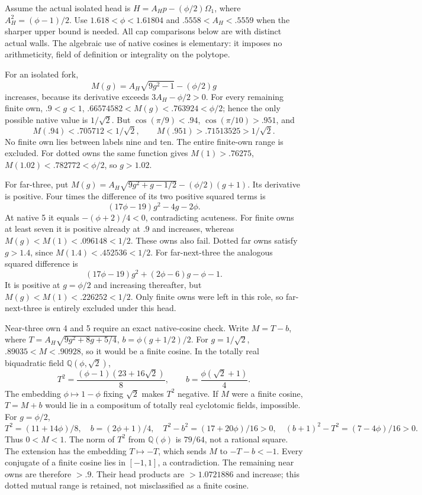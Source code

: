 \documentclass[11pt]{article}
\theoremstyle{definition}
\theoremstyle{remark}
\begin{document}
Assume the actual isolated head is
\(H=A_Hp-(\phi/2)\Omega_1\), where
\(A_H^2=(\phi-1)/2\).
Use \(1.618<\phi<1.61804\) and
\(.5558<A_H<.5559\) when the sharper upper bound is needed.
All cap comparisons below are with distinct actual walls.
The algebraic use of native cosines is elementary: it imposes
no arithmeticity, field of definition or integrality on the polytope.

For an isolated fork,
\[
 M(g)=A_H\sqrt{9g^2-1}-(\phi/2)g
\]
increases, because its derivative exceeds \(3A_H-\phi/2>0\).
For every remaining finite own, \(.9<g<1\),
\(.66574582<M(g)<.763924<\phi/2\); hence the only possible
native value is \(1/\sqrt2\).
But \(\cos(\pi/9)<.94\), \(\cos(\pi/10)>.951\), and
\[
 M(.94)<.705712<1/\sqrt2,\qquad
 M(.951)>.71513525>1/\sqrt2 .
\]
No finite own lies between labels nine and ten.
The entire finite-own range is excluded.
For dotted owns the same function gives
\(M(1)>.76275\), \(M(1.02)<.782772<\phi/2\),
so \(g>1.02\).

For far-three, put
\(M(g)=A_H\sqrt{9g^2+g-1/2}-(\phi/2)(g+1)\).
Its derivative is positive.
Four times the difference of its two positive squared terms is
\[
                  (17\phi-19)g^2-4g-2\phi .
\]
At native 5 it equals \(-(\phi+2)/4<0\), contradicting acuteness.
For finite owns at least seven it is positive already at \(.9\)
and increases, whereas \(M(g)<M(1)<.096148<1/2\).
These owns also fail.
Dotted far owns satisfy \(g>1.4\), since
\(M(1.4)<.452536<1/2\).
For far-next-three the analogous squared difference is
\[
             (17\phi-19)g^2+(2\phi-6)g-\phi-1.
\]
It is positive at \(g=\phi/2\) and increasing thereafter,
but \(M(g)<M(1)<.226252<1/2\).
Only finite owns were left in this role, so far-next-three is
entirely excluded under this head.

Near-three own 4 and 5 require an exact native-cosine check.
Write \(M=T-b\), where
\(T=A_H\sqrt{9g^2+8g+5/4}\),
\(b=\phi(g+1/2)/2\).
For \(g=1/\sqrt2\), \(.89035<M<.90928\), so it would be
a finite cosine.  In the totally real biquadratic field
\(\mathbb Q(\phi,\sqrt2)\),
\[
 T^2={\frac{(\phi-1)(23+16\sqrt2)}{8}},\qquad
 b={\frac{\phi(\sqrt2+1)}{4}}.
\]
The embedding \(\phi\mapsto1-\phi\) fixing \(\sqrt2\)
makes \(T^2\) negative.
If \(M\) were a finite cosine, \(T=M+b\) would lie in a
compositum of totally real cyclotomic fields, impossible.
For \(g=\phi/2\),
\[
 T^2=(11+14\phi)/8,\quad b=(2\phi+1)/4,\quad
 T^2-b^2=(17+20\phi)/16>0,\quad
 (b+1)^2-T^2=(7-4\phi)/16>0 .
\]
Thus \(0<M<1\).
The norm of \(T^2\) from \(\mathbb Q(\phi)\) is \(79/64\),
not a rational square.  The extension has the embedding
\(T\mapsto-T\), which sends \(M\) to \(-T-b<-1\).
Every conjugate of a finite cosine lies in \([-1,1]\), a
contradiction.
The remaining near owns are therefore \(>.9\).
Their head products are \(>1.0721886\) and increase; this dotted
mutual range is retained, not misclassified as a finite cosine.
\end{document}
